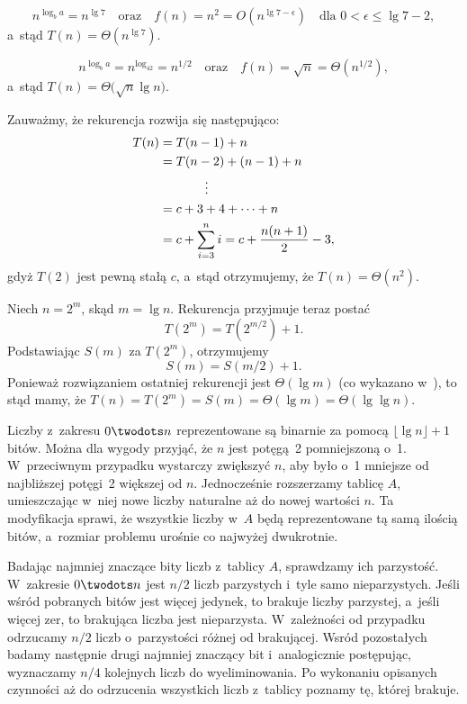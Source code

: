 \subproblem %
\[
	n^{\log_ba} = n^{\lg7} \quad\text{oraz}\quad f(n) = n^2 = O(n^{\lg7-\epsilon}) \quad\text{dla $0<\epsilon\le\lg7-2$},
\]
a~stąd $T(n)=\Theta(n^{\lg7})$.

\subproblem %
\[
	n^{\log_ba} = n^{\log_42} = n^{1/2} \quad\text{oraz}\quad f(n) = \sqrt{n} = \Theta(n^{1/2}),
\]
a~stąd $T(n)=\Theta\bigl(\!\sqrt{n}\lg n\bigr)$.

\subproblem %
Zauważmy, że rekurencja rozwija się następująco:
\begin{align*}
	T(n) &= T(n-1)+n \\
	&= T(n-2)+(n-1)+n \\
	&\hspace{.5in}\vdots \\
	&= c+3+4+\cdots+n \\
	&= c+\sum_{i=3}^ni = c+\frac{n(n+1)}{2}-3,
\end{align*}
gdyż $T(2)$ jest pewną stałą $c$, a~stąd otrzymujemy, że $T(n)=\Theta(n^2)$.

\subproblem %
Niech $n=2^m$, skąd $m=\lg n$. Rekurencja przyjmuje teraz postać
\[
	T(2^m) = T(2^{m/2})+1.
\]
Podstawiając $S(m)$ za $T(2^m)$, otrzymujemy
\[
	S(m) = S(m/2)+1.
\]
Ponieważ rozwiązaniem ostatniej rekurencji jest $\Theta(\lg m)$ (co wykazano w~), to stąd mamy, że $T(n)=T(2^m)=S(m)=\Theta(\lg m)=\Theta(\lg\lg n)$.

Liczby z~zakresu $0\twodots n$ reprezentowane są binarnie za pomocą $\lfloor\lg n\rfloor+1$ bitów. Można dla wygody przyjąć, że $n$ jest potęgą~2 pomniejszoną o~1. W~przeciwnym przypadku wystarczy zwiększyć $n$, aby było o~1 mniejsze od najbliższej potęgi~2 większej od $n$. Jednocześnie rozszerzamy tablicę $A$, umieszczając w~niej nowe liczby naturalne aż do nowej wartości $n$. Ta modyfikacja sprawi, że wszystkie liczby w~$A$ będą reprezentowane tą samą ilością bitów, a~rozmiar problemu urośnie co najwyżej dwukrotnie.

Badając najmniej znaczące bity liczb z~tablicy $A$, sprawdzamy ich parzystość. W~zakresie $0\twodots n$ jest $n/2$ liczb parzystych i~tyle samo nieparzystych. Jeśli wśród pobranych bitów jest więcej jedynek, to brakuje liczby parzystej, a~jeśli więcej zer, to brakująca liczba jest nieparzysta. W~zależności od przypadku odrzucamy $n/2$ liczb o~parzystości różnej od brakującej. Wsród pozostałych badamy następnie drugi najmniej znaczący bit i~analogicznie postępując, wyznaczamy $n/4$ kolejnych liczb do wyeliminowania. Po wykonaniu opisanych czynności aż do odrzucenia wszystkich liczb z~tablicy poznamy tę, której brakuje.

